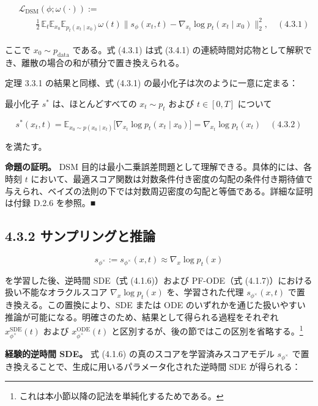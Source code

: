 \begin{align*}
\begin{aligned}
&\mathcal{L}_{\mathrm{DSM}}(\phi;\omega(\cdot)) := \\
&\qquad\tfrac12\,\mathbb{E}_{t}\mathbb{E}_{x_0}\mathbb{E}_{p_t(x_t\mid x_0)}
\omega(t)\bigl\|s_\phi(x_t,t)-\nabla_{x_t}\log p_t(x_t\mid x_0)\bigr\|_2^2, \quad (4.3.1)
\end{aligned}
\end{align*}


ここで $x_0\sim p_{\mathrm{data}}$ である。式 (4.3.1) は式 (3.4.1) の連続時間対応物として解釈でき、離散の場合の和が積分で置き換えられる。

定理 3.3.1 の結果と同様、式 (4.3.1) の最小化子は次のように一意に定まる：

\begin{propositionbox}
最小化子 $s^*$ は、ほとんどすべての $x_t\sim p_t$ および $t\in[0,T]$ について

\[
s^*(x_t,t)
= \mathbb{E}_{x_0\sim p(x_0\mid x_t)}\bigl[\nabla_{x_t}\log p_t(x_t\mid x_0)\bigr]
= \nabla_{x_t}\log p_t(x_t) \quad (4.3.2)
\]

を満たす。
\end{propositionbox}


\textbf{命題の証明。}
DSM 目的は最小二乗誤差問題として理解できる。具体的には、各時刻 $t$ において、最適スコア関数は対数条件付き密度の勾配の条件付き期待値で与えられ、ベイズの法則の下では対数周辺密度の勾配と等価である。詳細な証明は付録 D.2.6 を参照。■

\subsection*{4.3.2 サンプリングと推論}


\[
s_{\phi^\times}:=s_{\phi^\times}(x,t)\approx\nabla_x\log p_t(x)
\]


を学習した後、逆時間 SDE（式 (4.1.6)）および PF-ODE（式 (4.1.7)）における扱い不能なオラクルスコア $\nabla_x\log p_t(x)$ を、学習された代理 $s_{\phi^\times}(x,t)$ で置き換える。この置換により、SDE または ODE のいずれかを通じた扱いやすい推論が可能になる。明確さのため、結果として得られる過程をそれぞれ $x_{\phi^\times}^{\mathrm{SDE}}(t)$ および $x_{\phi^\times}^{\mathrm{ODE}}(t)$ と区別するが、後の節ではこの区別を省略する。\footnote{これは本小節以降の記法を単純化するためである。}

\textbf{経験的逆時間 SDE。} 式 (4.1.6) の真のスコアを学習済みスコアモデル $s_{\phi^\times}$ で置き換えることで、生成に用いるパラメータ化された逆時間 SDE が得られる：

